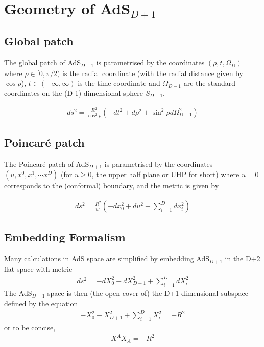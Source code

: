 \chapter{Geometry of AdS$_{D+1}$}
\section{Global patch}
The global patch of AdS$_{D+1}$ is parametrised by the coordinates $(\rho,t, \Omega_D)$ where $\rho \in [0,\pi/2)$ is the radial coordinate (with the radial distance given by $\cos \rho$), $t \in (-\infty,\infty)$ is the time coordinate and $\Omega_{D-1}$ are the standard coordinates on the (D-1) dimensional sphere $S_{D-1}$. 

\begin{align}
 ds^2 = \frac{R^2}{\cos^2 \rho} \left( -dt^2 + d\rho^2 + \sin^2\rho d\Omega_{D-1}^2 \right) \label{globads}
\end{align}

\section{Poincar\'{e} patch}
The Poincar\'{e} patch of AdS$_{D+1}$ is parametrised by the coordinates $(u,x^0, x^1, \cdots x^D)$ (for $u \geq 0$, the upper half plane or UHP for short) where $u=0$ corresponds to the (conformal) boundary, and the metric is given by  

\begin{align}
 ds^2 = \frac{R^2}{u^2} \left( -dx_0^2 + du^2 + \sum_{i=1}^D dx_i^2 \right) \label{poincareads}
\end{align}


\section{Embedding Formalism}
Many calculations in AdS space are simplified by embedding AdS$_{D+1}$ in the D+2 flat space with metric
\begin{align}
 ds^2 = -dX_0^2 -dX_{D+1}^2+\sum_{i=1}^D dX_i^2
\end{align}
The AdS$_{D+1}$ space is then (the open cover of) the D+1 dimensional subspace defined by the equation
\begin{align}
 -X_0^2 -X_{D+1}^2+\sum_{i=1}^D X_i^2 = -R^2
\end{align}
or to be concise,
\begin{align}
 X^A X_A = -R^2 \label{embedads}
\end{align}


